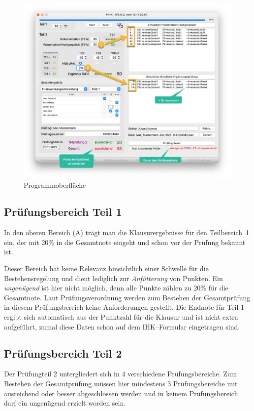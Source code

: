 \documentclass[a4paper,notitlepage,parskip=half]{scrartcl}
\begin{document}
\begin{figure}[ht]
    \centering
    \includegraphics[width=\textwidth]{HauptfensterKommentiert2.png}
    \caption{Programmoberfläche}
    \label{fig:hauptfensterKommentiert2}
\end{figure}

\subsection{Prüfungsbereich Teil 1}
In den oberen Bereich (A) trägt man die Klausurergebnisse für den Teilbereich~1 ein, der mit 20\% in die Gesamtnote eingeht und schon vor der Prüfung bekannt ist.

Dieser Bereich hat keine Relevanz hinsichtlich einer Schwelle für die Bestehensregelung und dient lediglich zur \emph{Anfütterung} von Punkten. Ein \emph{ungenügend} ist hier nicht möglich, denn alle Punkte zählen zu 20\% für die Gesamtnote. Laut Prüfungsverordnung werden zum Bestehen der Gesamtprüfung in diesem Prüfungsbereich keine Anforderungen gestellt. Die Endnote für Teil 1 ergibt sich automatisch aus der Punktzahl für die Klausur und ist nicht extra aufgeführt, zumal diese Daten schon auf dem IHK--Formular eingetragen sind.

\subsection{Prüfungsbereich Teil 2}
Der Prüfungteil 2 untergliedert sich in 4 verschiedene Prüfungsbereiche. Zum Bestehen der Gesamtprüfung müssen hier mindestens 3 Prüfungsbereiche mit ausreichend oder besser abgeschlossen werden und in keinem Prüfungsbereich darf ein ungenügend erzielt worden sein.
\end{document}
